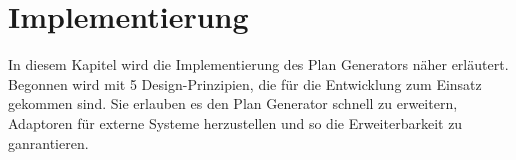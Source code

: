 \newpage
\section{Implementierung}

In diesem Kapitel wird die Implementierung des Plan Generators näher erläutert. Begonnen wird mit 5 Design-Prinzipien, die für die Entwicklung zum Einsatz gekommen sind. Sie erlauben es den Plan Generator schnell zu erweitern, Adaptoren für externe Systeme herzustellen und so die Erweiterbarkeit zu ganrantieren.










